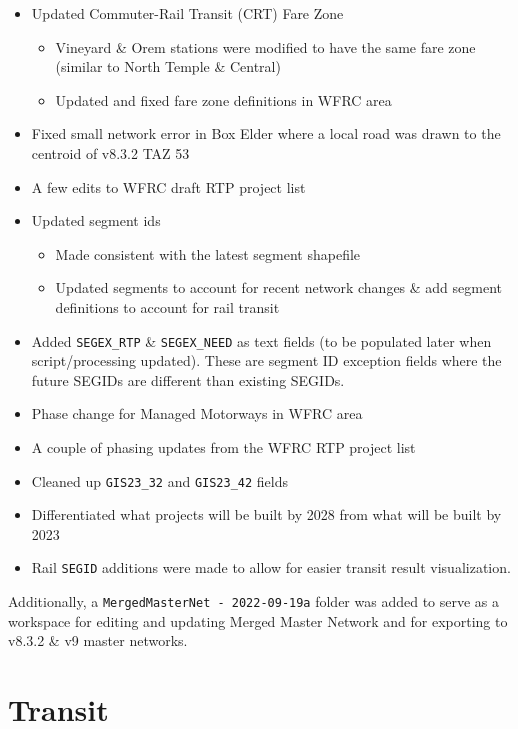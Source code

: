 \documentclass[
  letterpaper,
  DIV=11,
  numbers=noendperiod,
  titlepage=false]{scrreprt}
\providecommand{\tightlist}{%
  \setlength{\itemsep}{0pt}\setlength{\parskip}{0pt}}\usepackage{longtable,booktabs,array}
\begin{document}
\begin{itemize}
\tightlist
\item
  Updated Commuter-Rail Transit (CRT) Fare Zone

  \begin{itemize}
  \tightlist
  \item
    Vineyard \& Orem stations were modified to have the same fare zone
    (similar to North Temple \& Central)
  \item
    Updated and fixed fare zone definitions in WFRC area
  \end{itemize}
\item
  Fixed small network error in Box Elder where a local road was drawn to
  the centroid of v8.3.2 TAZ 53
\item
  A few edits to WFRC draft RTP project list
\item
  Updated segment ids

  \begin{itemize}
  \tightlist
  \item
    Made consistent with the latest segment shapefile
  \item
    Updated segments to account for recent network changes \& add
    segment definitions to account for rail transit
  \end{itemize}
\item
  Added \texttt{SEGEX\_RTP} \& \texttt{SEGEX\_NEED} as text fields (to
  be populated later when script/processing updated). These are segment
  ID exception fields where the future SEGIDs are different than
  existing SEGIDs.
\item
  Phase change for Managed Motorways in WFRC area
\item
  A couple of phasing updates from the WFRC RTP project list
\item
  Cleaned up \texttt{GIS23\_32} and \texttt{GIS23\_42} fields
\item
  Differentiated what projects will be built by 2028 from what will be
  built by 2023
\item
  Rail \texttt{SEGID} additions were made to allow for easier transit
  result visualization.
\end{itemize}

Additionally, a \texttt{MergedMasterNet\ -\ 2022-09-19a} folder was
added to serve as a workspace for editing and updating Merged Master
Network and for exporting to v8.3.2 \& v9 master networks.

\hypertarget{transit}{%
\section{Transit}\label{transit}}
\end{document}
